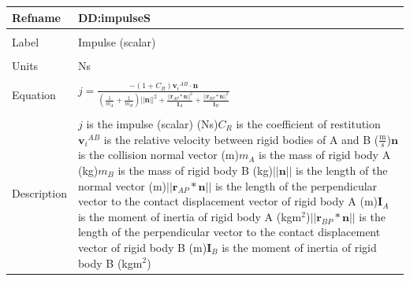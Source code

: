 \documentclass[12pt]{article}
\begin{document}
\noindent \begin{minipage}{\textwidth}
\begin{tabular}{p{} p{}}
\toprule \textbf{Refname} & \textbf{DD:impulseS}
\label{DD:impulseS}
\\ \midrule \\
Label & Impulse (scalar)
\\ \midrule \\
Units & Ns
\\ \midrule \\
Equation & $j=\frac{-\left(1+{C_{R}}\right) {{\mathbf{v}_{i}}^{AB}}\cdot{}\mathbf{n}}{\left(\frac{1}{{m_{A}}}+\frac{1}{{m_{B}}}\right) ||\mathbf{n}||^{2}+\frac{||{\mathbf{r}_{AP}}*\mathbf{n}||^{2}}{{\mathbf{I}_{A}}}+\frac{||{\mathbf{r}_{BP}}*\mathbf{n}||^{2}}{{\mathbf{I}_{B}}}}$
\\ \midrule \\
Description & $j$ is the impulse (scalar) (Ns)\newline${C_{R}}$ is the coefficient of restitution\newline${{\mathbf{v}_{i}}^{AB}}$ is the relative velocity between rigid bodies of A and B ($\frac{\text{m}}{\text{s}}$)\newline$\mathbf{n}$ is the collision normal vector (m)\newline${m_{A}}$ is the mass of rigid body A (kg)\newline${m_{B}}$ is the mass of rigid body B (kg)\newline$||\mathbf{n}||$ is the length of the normal vector (m)\newline$||{\mathbf{r}_{AP}}*\mathbf{n}||$ is the length of the perpendicular vector to the contact displacement vector of rigid body A (m)\newline${\mathbf{I}_{A}}$ is the moment of inertia of rigid body A (kg$\text{m}^{2}$)\newline$||{\mathbf{r}_{BP}}*\mathbf{n}||$ is the length of the perpendicular vector to the contact displacement vector of rigid body B (m)\newline${\mathbf{I}_{B}}$ is the moment of inertia of rigid body B (kg$\text{m}^{2}$)
\\ \bottomrule \end{tabular}
\end{minipage}\\
\end{document}
